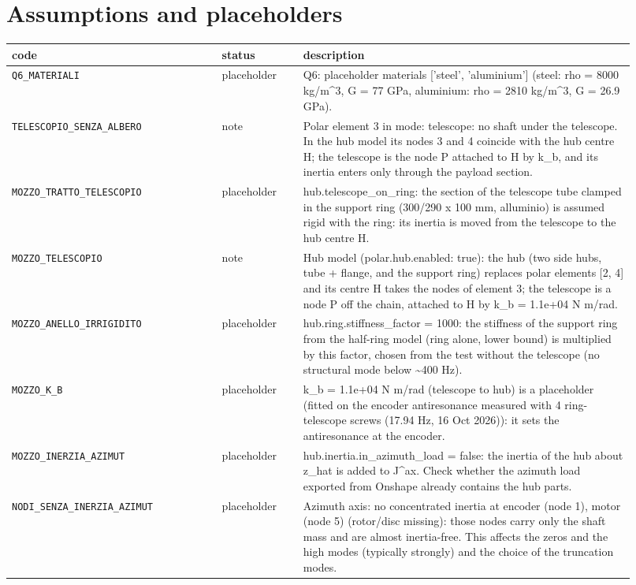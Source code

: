 \documentclass[10pt,a4paper]{article}
\numberwithin{equation}{section}
\begin{document}
\section{Assumptions and placeholders}\label{sec:assumptions}
\begin{longtable}{p{0.31\linewidth}p{0.12\linewidth}p{0.49\linewidth}}
\toprule code & status & description \\ \midrule\endhead
\texttt{Q6\_MATERIALI} & placeholder & Q6: placeholder materials ['steel', 'aluminium'] (steel: rho = 8000 kg/m\^{}3, G = 77 GPa, aluminium: rho = 2810 kg/m\^{}3, G = 26.9 GPa). \\
\texttt{TELESCOPIO\_SENZA\_ALBERO} & note & Polar element 3 in mode: telescope: no shaft under the telescope. In the hub model its nodes 3 and 4 coincide with the hub centre H; the telescope is the node P attached to H by k\_b, and its inertia enters only through the payload section. \\
\texttt{MOZZO\_TRATTO\_TELESCOPIO} & placeholder & hub.telescope\_on\_ring: the section of the telescope tube clamped in the support ring (300/290 x 100 mm, alluminio) is assumed rigid with the ring: its inertia is moved from the telescope to the hub centre H. \\
\texttt{MOZZO\_TELESCOPIO} & note & Hub model (polar.hub.enabled: true): the hub (two side hubs, tube + flange, and the support ring) replaces polar elements [2, 4] and its centre H takes the nodes of element 3; the telescope is a node P off the chain, attached to H by k\_b = 1.1e+04 N m/rad. \\
\texttt{MOZZO\_ANELLO\_IRRIGIDITO} & placeholder & hub.ring.stiffness\_factor = 1000: the stiffness of the support ring from the half-ring model (ring alone, lower bound) is multiplied by this factor, chosen from the test without the telescope (no structural mode below \textasciitilde{}400 Hz). \\
\texttt{MOZZO\_K\_B} & placeholder & k\_b = 1.1e+04 N m/rad (telescope to hub) is a placeholder (fitted on the encoder antiresonance measured with 4 ring-telescope screws (17.94 Hz, 16 Oct 2026)): it sets the antiresonance at the encoder. \\
\texttt{MOZZO\_INERZIA\_AZIMUT} & placeholder & hub.inertia.in\_azimuth\_load = false: the inertia of the hub about z\_hat is added to J\^{}ax. Check whether the azimuth load exported from Onshape already contains the hub parts. \\
\texttt{NODI\_SENZA\_INERZIA\_AZIMUT} & placeholder & Azimuth axis: no concentrated inertia at encoder (node 1), motor (node 5) (rotor/disc missing): those nodes carry only the shaft mass and are almost inertia-free. This affects the zeros and the high modes (typically strongly) and the choice of the truncation modes. \\

\end{longtable}
\end{document}
